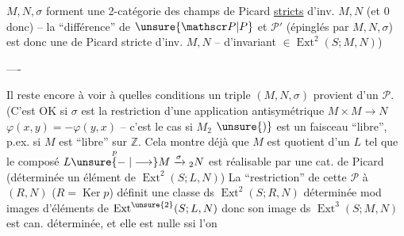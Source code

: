 $M,N,\sigma$ forment une 2-catégorie  des champs de Picard \uline{stricts} d'inv. $M,N$ (et 0 donc) -- la ``différence'' de  $\unsure{\mathscr P|P}$ et $\mathscr P'$ (épinglés par $M,N,\sigma$) est donc une  de Picard stricte d'inv. $M,N$ -- d'invariant $\in\operatorname{Ext}^2(S;M,N)$)

\noindent ----

 Il reste encore à voir à quelles conditions un triple $(M,N,\sigma)$ provient d'un $\mathscr P$. 
(C'est OK si $\sigma$ est la restriction d'une application  antisymétrique $M\times M\longrightarrow N$ $\varphi(x,y)=-\varphi(y,x)$ -- c'est le cas si $M_2$  $\unsure{)}$ est un faisceau ``libre'', p.ex. si $M$ est ``libre'' sur $\mathbb Z$. Cela montre déjà que $M$ est quotient d'un $L$ tel que le composé $L\overset{p}{\unsure{\relbar|\longrightarrow}}M\xrightarrow{\sigma}{}_2N$ est réalisable par une cat. de Picard  (déterminée  un élément de $\operatorname{Ext}^2(S;L,N)$) La ``restriction'' de cette $\mathscr P$ à $(R,N)$ ($R=\operatorname{Ker}p$) définit une classe ds $\operatorname{Ext}^2(S;R,N)$ déterminée mod images d'éléments de $\operatorname{Ext}^{\unsure{2}}(S;L,N)$ donc son image  ds $\operatorname{Ext}^3(S;M,N)$ est can. déterminée, et elle est nulle ssi l'on
